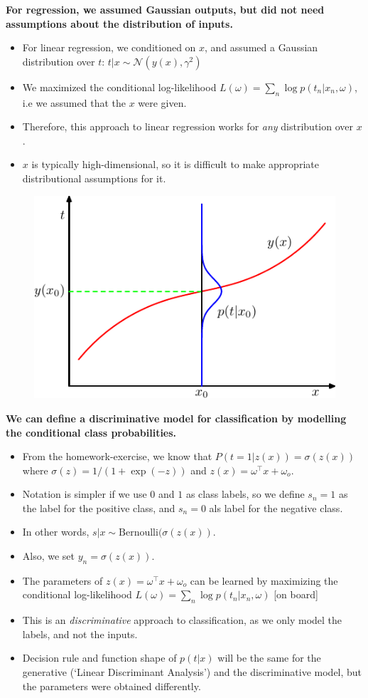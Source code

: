 \textbf{For regression, we assumed Gaussian outputs, but did not need assumptions about the distribution of inputs.}
\begin{itemize}
\item For linear regression, we conditioned on $x$, and assumed a Gaussian distribution over $t$: $t|x \sim \mathcal{N}(y(x), \gamma^2)$
\item  We maximized the conditional log-likelihood $L(\omega)=\sum_n \log p(t_n|x_n, \omega)$, i.e we assumed that the $x$ were given.
\item  Therefore, this approach to linear regression works for \emph{any} distribution over $x$.
\item $x$ is typically high-dimensional, so it is difficult to make appropriate distributional assumptions for it. 
\end{itemize}

\begin{figure}
	\centering
	\includegraphics[width=.4\textwidth]{./lecture7/Figure128.pdf}
\end{figure}


\textbf{We can define a discriminative model for classification by modelling the conditional class probabilities.}
\begin{itemize}
\item From the homework-exercise, we know that $P(t=1 | z(x))=\sigma(z(x))$ where $\sigma(z)=1/(1+\exp(-z))$ and $z(x)=
\omega^\top x+\omega_o$.
\item Notation is simpler if we use $0$ and $1$ as class labels, so we define $s_n=1$ as the label for the positive class, and $s_n=0$ als label for the negative class.
\item In other words, $s |x \sim \mbox{Bernoulli}(\sigma(z(x))$.
\item Also, we set $y_n=\sigma(z(x))$.
\item  The parameters of $z(x)=\omega^\top x+ \omega_o$ can be learned by maximizing the conditional log-likelihood $L(\omega)=\sum_n \log p(t_n|x_n, \omega)$ [on board]
\item  This is an \emph{discriminative} approach to classification, as we only model the labels, and not the inputs.
\item 
 Decision rule and function shape of $p(t|x)$ will be the same for the generative (`Linear Discriminant Analysis') and the discriminative model, but the parameters were obtained differently.
\end{itemize}


